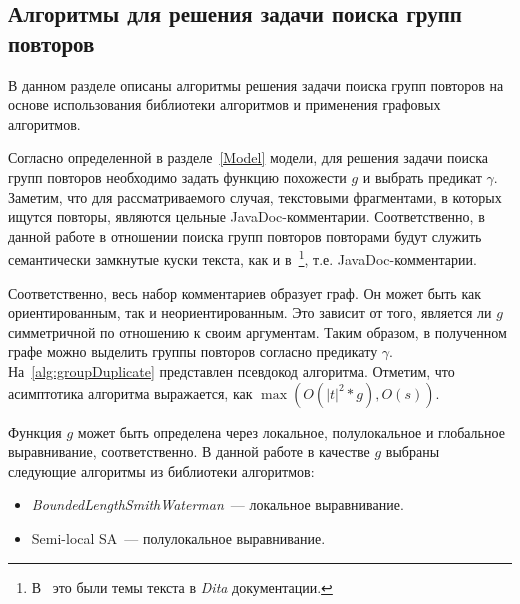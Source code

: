



\subsection{Алгоритмы для решения задачи поиска групп повторов}\label{grouppa}
В данном разделе описаны алгоритмы решения задачи поиска групп повторов на основе использования библиотеки алгоритмов и применения графовых алгоритмов.

Согласно определенной в разделе~\ref{Model} модели, для решения задачи {поиска групп повторов}  необходимо
задать функцию похожести $g$ и выбрать предикат $\gamma$.
Заметим, что для рассматриваемого случая, текстовыми фрагментами, в которых ищутся повторы, являются цельные JavaDoc-комментарии.
Соответственно, в данной работе в отношении поиска групп повторов {повторами} будут служить семантически замкнутые куски текста, как и в~\cite{soto2015similarity}\footnote{В~\cite{soto2015similarity} это были темы текста в \emph{Dita} документации.}, т.е. JavaDoc-комментарии.

Соответственно, весь набор комментариев образует граф.
Он может быть как ориентированным, так и неориентированным.
Это зависит  от того, является ли $g$ симметричной по отношению к своим аргументам.
Таким образом, в полученном графе можно выделить группы повторов согласно предикату $\gamma$.
На~\ref{alg:groupDuplicate} представлен псевдокод алгоритма.
Отметим, что асимптотика алгоритма выражается, как $\max (O(|t|^2*g), O(s))$.

Функция $g$ может быть определена через локальное, полулокальное и глобальное выравнивание, соответственно.
В данной работе в качестве $g$ выбраны следующие алгоритмы из библиотеки алгоритмов:
\begin{itemize}
    \item \emph{BoundedLengthSmithWaterman}~--- локальное выравнивание.
    \item {Semi-local SA}~--- полулокальное выравнивание.
\end{itemize}

